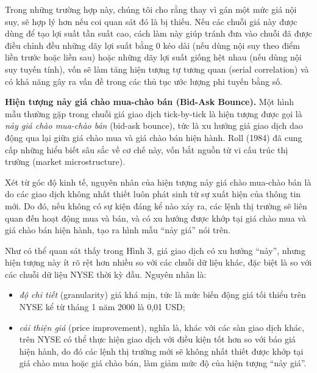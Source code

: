 Trong những trường hợp này, chúng tôi cho rằng thay vì gán một mức giá nội suy, sẽ hợp lý hơn nếu coi quan sát đó là bị thiếu. Nếu các chuỗi giá này được dùng để tạo lợi suất tần suất cao, cách làm này giúp tránh đưa vào chuỗi đã được điều chỉnh đều những dãy lợi suất bằng 0 kéo dài (nếu dùng nội suy theo điểm liền trước hoặc liền sau) hoặc những dãy lợi suất giống hệt nhau (nếu dùng nội suy tuyến tính), vốn sẽ làm tăng hiện tượng tự tương quan (serial correlation) và có khả năng gây ra vấn đề trong các thủ tục ước lượng phi tuyến bằng số.

\noindent\textbf{Hiện tượng nảy giá chào mua-chào bán (Bid-Ask Bounce).} Một hình mẫu thường gặp trong chuỗi giá giao dịch tick-by-tick là hiện tượng được gọi là \textit{nảy giá chào mua-chào bán} (bid-ask bounce), tức là xu hướng giá giao dịch dao động qua lại giữa giá chào mua và giá chào bán hiện hành. Roll (1984) đã cung cấp những hiểu biết sâu sắc về cơ chế này, vốn bắt nguồn từ vi cấu trúc thị trường (market microstructure).

Xét từ góc độ kinh tế, nguyên nhân của hiện tượng nảy giá chào mua-chào bán là do các giao dịch không nhất thiết luôn phát sinh từ sự xuất hiện của thông tin mới. Do đó, nếu không có sự kiện đáng kể nào xảy ra, các lệnh thị trường sẽ liên quan đến hoạt động mua và bán, và có xu hướng được khớp tại giá chào mua và giá chào bán hiện hành, tạo ra hình mẫu ``nảy giá'' nói trên.

Như có thể quan sát thấy trong Hình 3, giá giao dịch có xu hướng ``nảy'', nhưng hiện tượng này ít rõ rệt hơn nhiều so với các chuỗi dữ liệu khác, đặc biệt là so với các chuỗi dữ liệu NYSE thời kỳ đầu. Nguyên nhân là:

\begin{itemize}
  \item \textit{độ chi tiết} (granularity) giá khá mịn, tức là mức biến động giá tối thiểu trên NYSE kể từ tháng 1 năm 2000 là 0,01 USD;
  \item \textit{cải thiện giá} (price improvement), nghĩa là, khác với các sàn giao dịch khác, trên NYSE có thể thực hiện giao dịch với điều kiện tốt hơn so với báo giá hiện hành, do đó các lệnh thị trường mới sẽ không nhất thiết được khớp tại giá chào mua hoặc giá chào bán, làm giảm mức độ của hiện tượng ``nảy giá''.
\end{itemize}

